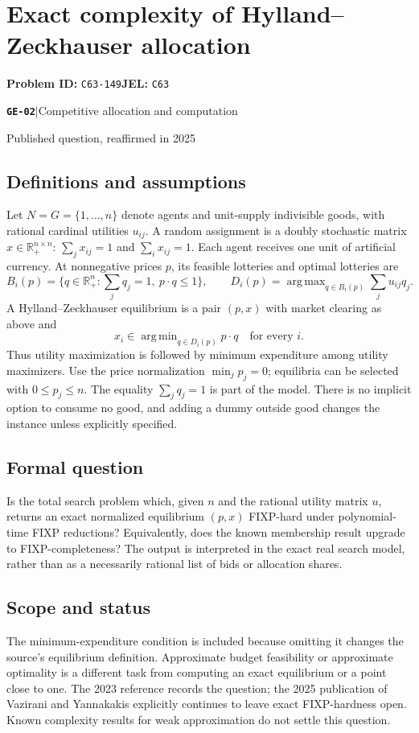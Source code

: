 \documentclass[11pt,a4paper]{article}
\newcommand{\R}{\mathbb R}
\DeclareMathOperator*{\argmin}{arg\,min}
\DeclareMathOperator*{\argmax}{arg\,max}
\newcommand{\entrymeta}[3]{{\sffamily\small\color{muted}\textbf{\texttt{#1}}\quad|\quad #2\par #3\par}}
\begin{document}
\section*{Exact complexity of Hylland--Zeckhauser allocation}
\textbf{Problem ID:} \texttt{C63-149}\quad \textbf{JEL:} \texttt{C63}\par
\label{problem:OP-0574}
\label{beyond:GE-02}
\entrymeta{GE-02}{Competitive allocation and computation}{Published question, reaffirmed in 2025}
\subsection*{Definitions and assumptions}
Let $N=G=\{1,\ldots,n\}$ denote agents and unit-supply indivisible goods, with rational cardinal utilities $u_{ij}$. A random assignment is a doubly stochastic matrix $x\in\R^{n\times n}_+$: $\sum_jx_{ij}=1$ and $\sum_ix_{ij}=1$. Each agent receives one unit of artificial currency. At nonnegative prices $p$, its feasible lotteries and optimal lotteries are
\[
 B_i(p)=\{q\in\R^n_+:\textstyle\sum_jq_j=1,\ p\cdot q\le1\},\qquad
 D_i(p)=\argmax_{q\in B_i(p)}\sum_ju_{ij}q_j.
\]
A Hylland--Zeckhauser equilibrium is a pair $(p,x)$ with market clearing as above and
\[
 x_i\in\argmin_{q\in D_i(p)}p\cdot q\quad\text{for every }i.
\]
Thus utility maximization is followed by minimum expenditure among utility maximizers. Use the price normalization $\min_jp_j=0$; equilibria can be selected with $0\le p_j\le n$. The equality $\sum_jq_j=1$ is part of the model. There is no implicit option to consume no good, and adding a dummy outside good changes the instance unless explicitly specified.
\subsection*{Formal question}
Is the total search problem which, given $n$ and the rational utility matrix $u$, returns an exact normalized equilibrium $(p,x)$ FIXP-hard under polynomial-time FIXP reductions? Equivalently, does the known membership result upgrade to FIXP-completeness? The output is interpreted in the exact real search model, rather than as a necessarily rational list of bids or allocation shares.
\subsection*{Scope and status}
The minimum-expenditure condition is included because omitting it changes the source's equilibrium definition. Approximate budget feasibility or approximate optimality is a different task from computing an exact equilibrium or a point close to one. The 2023 reference records the question; the 2025 publication of Vazirani and Yannakakis explicitly continues to leave exact FIXP-hardness open. Known complexity results for weak approximation do not settle this question.
\end{document}
